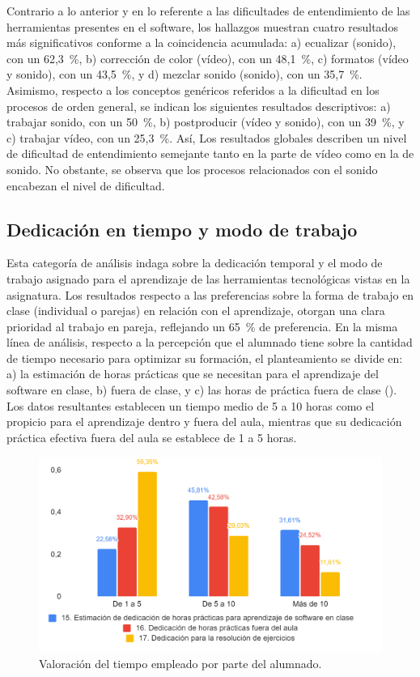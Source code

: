 \documentclass[spanish]{textolivre}
\begin{document}
Contrario a lo anterior y en lo referente a las dificultades de entendimiento de las herramientas presentes en el software, los hallazgos muestran cuatro resultados más significativos conforme a la coincidencia acumulada: a) ecualizar (sonido), con un 62,3~\%, b) corrección de color (vídeo), con un 48,1~\%, c) formatos (vídeo y sonido), con un 43,5~\%, y d) mezclar sonido (sonido), con un 35,7~\%. Asimismo, respecto a los conceptos genéricos referidos a la dificultad en los procesos de orden general, se indican los siguientes resultados descriptivos: a) trabajar sonido, con un 50~\%, b) postproducir (vídeo y sonido), con un 39~\%, y c) trabajar vídeo, con un 25,3~\%. Así, Los resultados globales describen un nivel de dificultad de entendimiento semejante tanto en la parte de vídeo como en la de sonido. No obstante, se observa que los procesos relacionados con el sonido encabezan el nivel de dificultad.

\subsection{Dedicación en tiempo y modo de trabajo}\label{sec-resumo}
Esta categoría de análisis indaga sobre la dedicación temporal y el modo de trabajo asignado para el aprendizaje de las herramientas tecnológicas vistas en la asignatura. Los resultados respecto a las preferencias sobre la forma de trabajo en clase (individual o parejas) en relación con el aprendizaje, otorgan una clara prioridad al trabajo en pareja, reflejando un 65~\% de preferencia. En la misma línea de análisis, respecto a la percepción que el alumnado tiene sobre la cantidad de tiempo necesario para optimizar su formación, el planteamiento se divide en: a) la estimación de horas prácticas que se necesitan para el aprendizaje del software en clase, b) fuera de clase, y c) las horas de práctica fuera de clase (). Los datos resultantes establecen un tiempo medio de 5 a 10 horas como el propicio para el aprendizaje dentro y fuera del aula, mientras que su dedicación práctica efectiva fuera del aula se establece de 1 a 5 horas.

\begin{figure}[h!]
\centering
\begin{minipage}{.8\textwidth}
\includegraphics[width=\linewidth]{Fig2.png}
\caption{Valoración del tiempo empleado por parte del alumnado.}
\label{fig2}
\end{minipage}
\end{figure}
\end{document}

